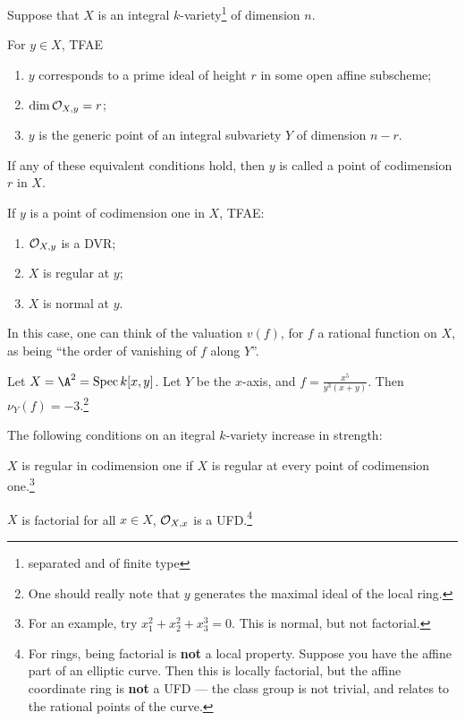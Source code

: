 \documentclass[11pt]{article}
\begin{document}
\begin{Nov8}
Suppose that $X$ is an integral $k$-variety\footnote{separated and of finite type} of dimension $n$.
\begin{prop*}
For $y\in X$, TFAE
\begin{enumerate}\squishlist
\item $y$ corresponds to a prime ideal of height $r$ in some open affine subscheme;
\item $\dim\mathcal{O}_{X,y}=r$;
\item $y$ is the generic point of an integral subvariety $Y$ of dimension $n-r$.
\end{enumerate}
\end{prop*}
\begin{defn*}
If any of these equivalent conditions hold, then $y$ is called a point of codimension $r$ in $X$.
\end{defn*}
\begin{cor*}
If $y$ is a point of codimension one in $X$, TFAE:
\begin{enumerate}\squishlist
\item $\mathcal{O}_{X,y}$ is a DVR;
\item $X$ is regular at $y$;
\item $X$ is normal at $y$.
\end{enumerate}
\end{cor*}
\noindent In this case, one can think of the valuation $v(f)$, for $f$ a rational function on $X$, as being ``the order of vanishing of $f$ along $Y$''.
\begin{exmp*}
Let $X=\A^2=\spec k[x,y]$. Let $Y$ be the $x$-axis, and $f=\frac{x^5}{y^3(x+y)}$. Then $\nu_Y(f)=-3$.\footnote{One should really note that $y$ generates the maximal ideal of the local ring.}
\end{exmp*}
\begin{defn*} The following conditions on an itegral $k$-variety increase in strength:
\begin{itemise}
\item $X$ is regular in codimension one if $X$ is regular at every point of codimension one.\footnote{ For an example, try $x^2_1+x_2^2+x_3^3=0$. This is normal, but not factorial.}
\item $X$ is factorial \Iff for all $x\in X$, $\mathcal{O}_{X,x}$ is a UFD.\footnote{For rings, being factorial is \textbf{not} a local property. Suppose you have the affine part of an elliptic curve. Then this is locally factorial, but the affine coordinate ring is \textbf{not} a UFD --- the class group is not trivial, and relates to the rational points of the curve.}

\end{itemise}
\end{defn*}
\end{Nov8}
\end{document}
